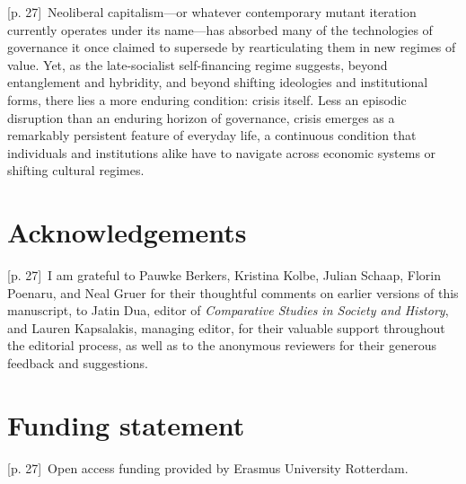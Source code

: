\documentclass[10pt,a4paper]{article}
\begin{document}
{\scriptsize\color{gray} [p. 27]}\ Neoliberal capitalism—or whatever contemporary mutant iteration currently operates under its name—has absorbed many of the technologies of governance it once claimed to supersede by rearticulating them in new regimes of value. Yet, as the late-socialist self-financing regime suggests, beyond entanglement and hybridity, and beyond shifting ideologies and institutional forms, there lies a more enduring condition: crisis itself. Less an episodic disruption than an enduring horizon of governance, crisis emerges as a remarkably persistent feature of everyday life, a continuous condition that individuals and institutions alike have to navigate across economic systems or shifting cultural regimes.\par
{}\section*{Acknowledgements}
{\scriptsize\color{gray} [p. 27]}\ I am grateful to Pauwke Berkers, Kristina Kolbe, Julian Schaap, Florin Poenaru, and Neal Gruer for their thoughtful comments on earlier versions of this manuscript, to Jatin Dua, editor of \textit{Comparative Studies in Society and History}, and Lauren Kapsalakis, managing editor, for their valuable support throughout the editorial process, as well as to the anonymous reviewers for their generous feedback and suggestions.\par
{}\section*{Funding statement}
{\scriptsize\color{gray} [p. 27]}\ Open access funding provided by Erasmus University Rotterdam.\par
\end{document}
